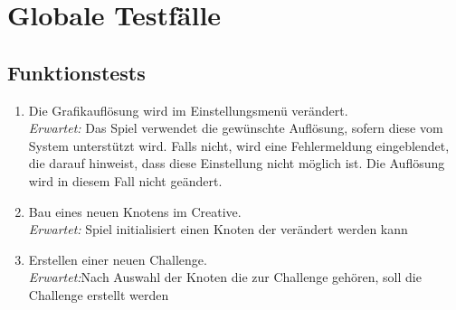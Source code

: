 \chapter{Globale Testfälle}

\renewcommand{\theenumi}{/T\_\arabic{enumi}0/}
\renewcommand{\labelenumi}{\theenumi}

\section{Funktionstests}

\begin{enumerate}
\item Die Grafikauflösung wird im Einstellungsmenü verändert.\\
\textit{Erwartet:} Das Spiel verwendet die gewünschte Auflösung, sofern diese vom System unterstützt wird. Falls nicht, wird eine Fehlermeldung eingeblendet, die darauf hinweist, dass diese Einstellung nicht möglich ist. Die Auflösung wird in diesem Fall nicht geändert.

\item Bau eines neuen Knotens im Creative.\\
\textit{Erwartet:} Spiel initialisiert einen Knoten der verändert werden kann

\item Erstellen einer neuen Challenge.\\
\textit{Erwartet:}Nach Auswahl der Knoten die zur Challenge gehören, soll die Challenge erstellt werden
	 	

\end{enumerate}
